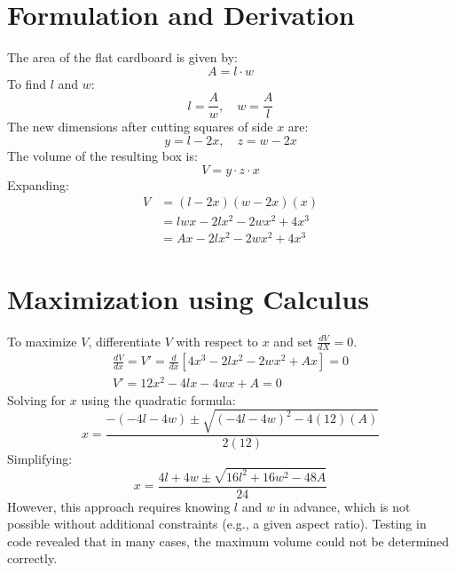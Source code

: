 \documentclass{article}
\begin{document}
\section{Formulation and Derivation}
The area of the flat cardboard is given by:
\begin{equation}
    A = l \cdot w
\end{equation}
To find \( l \) and \( w \):
\begin{equation}
    l = \frac{A}{w}, \quad w = \frac{A}{l}
\end{equation}
The new dimensions after cutting squares of side \( x \) are:
\begin{equation}
    y = l - 2x, \quad z = w - 2x
\end{equation}
The volume of the resulting box is:
\begin{equation}
    V = y \cdot z \cdot x
\end{equation}
Expanding:
\begin{align*}
    V &= (l - 2x)(w - 2x)(x) \\
      &= lwx - 2lx^2 - 2wx^2 + 4x^3 \\
      &= Ax - 2lx^2 - 2wx^2 + 4x^3
\end{align*}


\section{Maximization using Calculus}
To maximize \( V \), differentiate \( V \) with respect to \( x \) and set \(\frac{dV}{dX} = 0\).
\begin{align}
    \frac{dV}{dx} = V' = \frac{d}{dx}\left[4x^3 - 2lx^2 - 2wx^2 + Ax\right] = 0 \\
    V' = 12x^2 - 4lx - 4wx + A = 0
\end{align}
Solving for \( x \) using the quadratic formula:
\begin{equation}
    x = \frac{-\left(-4l - 4w\right) \pm \sqrt{\left(-4l - 4w\right)^2 - 4\left(12\right)\left(A\right)}}{2\left(12\right)}
\end{equation}
Simplifying:
\begin{equation}
    \label{eq:quadratic}
    x = \frac{4l + 4w \pm \sqrt{16l^2 + 16w^2 - 48A}}{24}
\end{equation}
However, this approach requires knowing \( l \) and \( w \) in advance, which is not possible without additional constraints (e.g., a given aspect ratio). Testing in code revealed that in many cases, the maximum volume could not be determined correctly.
\end{document}
